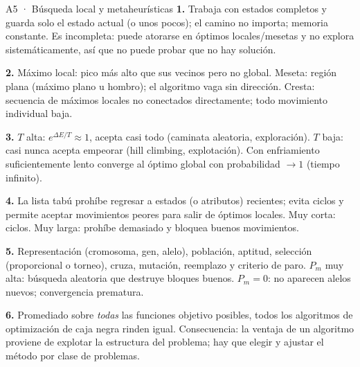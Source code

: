 \begin{solucion}{A5 · Búsqueda local y metaheurísticas}
\textbf{1.} Trabaja con estados completos y guarda solo el estado actual (o unos pocos); el camino no
importa; memoria constante. Es incompleta: puede atorarse en óptimos locales/mesetas y no explora
sistemáticamente, así que no puede probar que no hay solución.

\textbf{2.} Máximo local: pico más alto que sus vecinos pero no global. Meseta: región plana
(máximo plano u hombro); el algoritmo vaga sin dirección. Cresta: secuencia de máximos locales no
conectados directamente; todo movimiento individual baja.

\textbf{3.} $T$ alta: $e^{\Delta E/T}\approx1$, acepta casi todo (caminata aleatoria, exploración).
$T$ baja: casi nunca acepta empeorar (hill climbing, explotación). Con enfriamiento suficientemente
lento converge al óptimo global con probabilidad $\to1$ (tiempo infinito).

\textbf{4.} La lista tabú prohíbe regresar a estados (o atributos) recientes; evita ciclos y permite
aceptar movimientos peores para salir de óptimos locales. Muy corta: ciclos. Muy larga: prohíbe
demasiado y bloquea buenos movimientos.

\textbf{5.} Representación (cromosoma, gen, alelo), población, aptitud, selección (proporcional o
torneo), cruza, mutación, reemplazo y criterio de paro. $P_m$ muy alta: búsqueda aleatoria que
destruye bloques buenos. $P_m=0$: no aparecen alelos nuevos; convergencia prematura.

\textbf{6.} Promediado sobre \emph{todas} las funciones objetivo posibles, todos los algoritmos de
optimización de caja negra rinden igual. Consecuencia: la ventaja de un algoritmo proviene de
explotar la estructura del problema; hay que elegir y ajustar el método por clase de problemas.
\end{solucion}

